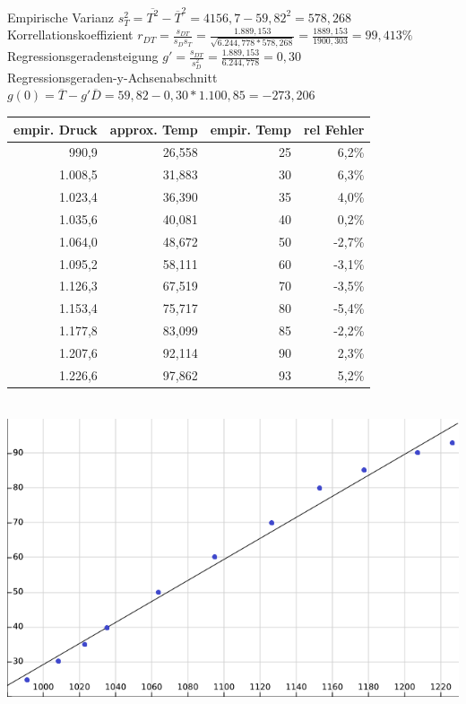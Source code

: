 \documentclass[12pt]{article} %
\begin{document}
Empirische Varianz $s_{T}^2 = \overline{T^2} - \overline{T}^2 = 4156,7 - 59,82^2 = 578,268$ \\[1ex]
Korrellationskoeffizient $r_{DT} = \frac{s_{DT}}{s_{D}s_{T}} = \frac{1.889,153}{\sqrt{6.244,778 * 578,268}} = \frac{1889,153}{1900,303} = 99,413 \%$\\[1ex]
Regressionsgeradensteigung $g' = \frac{s_{DT}}{s_{D}^2} = \frac{1.889,153}{6.244,778} = 0,30$\\
Regressionsgeraden-y-Achsenabschnitt $g(0) = \overline{T} - g' \overline{D} = 59,82 - 0,30 * 1.100,85 = -273,206$ \\
\begin{tabular}{|r|r|r|r|}
\hline
empir. Druck & approx. Temp & empir. Temp & rel Fehler \\ \hline \hline
990,9 & 26,558 & 25 & 6,2\%\\ \hline
1.008,5 & 31,883 & 30 & 6,3\%\\ \hline
1.023,4 & 36,390 & 35 & 4,0\%\\ \hline
1.035,6 & 40,081 & 40 & 0,2\%\\ \hline
1.064,0 & 48,672 & 50 & -2,7\%\\ \hline
1.095,2 & 58,111 & 60 & -3,1\%\\ \hline
1.126,3 & 67,519 & 70 & -3,5\%\\ \hline
1.153,4 & 75,717 & 80 & -5,4\%\\ \hline
1.177,8 & 83,099 & 85 & -2,2\%\\ \hline
1.207,6 & 92,114 & 90 & 2,3\%\\ \hline
1.226,6 & 97,862 & 93 & 5,2\%\\ \hline
\end{tabular}\\
\includegraphics{A28.png}\\
\end{document}
